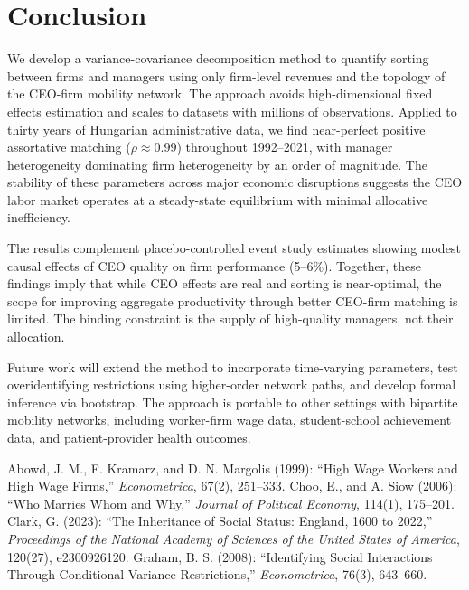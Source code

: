 \documentclass[11pt]{article}
\begin{document}
\section{Conclusion}
We develop a variance-covariance decomposition method to quantify sorting between firms and managers using only firm-level revenues and the topology of the CEO-firm mobility network. The approach avoids high-dimensional fixed effects estimation and scales to datasets with millions of observations. Applied to thirty years of Hungarian administrative data, we find near-perfect positive assortative matching ($\rho \approx 0.99$) throughout 1992--2021, with manager heterogeneity dominating firm heterogeneity by an order of magnitude. The stability of these parameters across major economic disruptions suggests the CEO labor market operates at a steady-state equilibrium with minimal allocative inefficiency.

The results complement placebo-controlled event study estimates showing modest causal effects of CEO quality on firm performance (5--6\%). Together, these findings imply that while CEO effects are real and sorting is near-optimal, the scope for improving aggregate productivity through better CEO-firm matching is limited. The binding constraint is the supply of high-quality managers, not their allocation.

Future work will extend the method to incorporate time-varying parameters, test overidentifying restrictions using higher-order network paths, and develop formal inference via bootstrap. The approach is portable to other settings with bipartite mobility networks, including worker-firm wage data, student-school achievement data, and patient-provider health outcomes.


\begin{thebibliography}{9}
 Abowd, J. M., F. Kramarz, and D. N. Margolis (1999): ``High Wage Workers and High Wage Firms,'' \emph{Econometrica}, 67(2), 251--333.
 Choo, E., and A. Siow (2006): ``Who Marries Whom and Why,'' \emph{Journal of Political Economy}, 114(1), 175--201.
 Clark, G. (2023): ``The Inheritance of Social Status: England, 1600 to 2022,'' \emph{Proceedings of the National Academy of Sciences of the United States of America}, 120(27), e2300926120.
 Graham, B. S. (2008): ``Identifying Social Interactions Through Conditional Variance Restrictions,'' \emph{Econometrica}, 76(3), 643--660.
\end{thebibliography}
\end{document}
